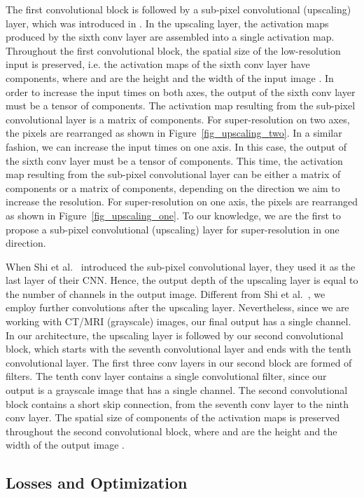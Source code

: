\documentclass{ieeeaccess}
\begin{document}
The first convolutional block is followed by a sub-pixel convolutional (upscaling) layer, which was introduced in \cite{Shi-CVPR-2016}. In the upscaling layer, the activation maps produced by the sixth conv layer are assembled into a single activation map. Throughout the first convolutional block, the spatial size of the low-resolution input is preserved, i.e. the activation maps of the sixth conv layer have  components, where  and  are the height and the width of the input image . In order to increase the input  times on both axes, the output of the sixth conv layer must be a tensor of  components. The activation map resulting from the sub-pixel convolutional layer is a matrix of  components. For super-resolution on two axes, the pixels are rearranged as shown in Figure~\ref{fig_upscaling_two}. In a similar fashion, we can increase the input  times on one axis. In this case, the output of the sixth conv layer must be a tensor of  components. This time, the activation map resulting from the sub-pixel convolutional layer can be either a matrix of  components or a matrix of  components, depending on the direction we aim to increase the resolution. For super-resolution on one axis, the pixels are rearranged as shown in Figure~\ref{fig_upscaling_one}. To our knowledge, we are the first to propose a sub-pixel convolutional (upscaling) layer for super-resolution in one direction.

When Shi et al.~\cite{Shi-CVPR-2016} introduced the sub-pixel convolutional layer, they used it as the last layer of their CNN. Hence, the output depth of the upscaling layer is equal to the number of channels in the output image. Different from Shi et al.~\cite{Shi-CVPR-2016}, we employ further convolutions after the upscaling layer. Nevertheless, since we are working with CT/MRI (grayscale) images, our final output has a single channel. In our architecture, the upscaling layer is followed by our second convolutional block, which starts with the seventh convolutional layer and ends with the tenth convolutional layer. The first three conv layers in our second block are formed of  filters. The tenth conv layer contains a single convolutional filter, since our output is a grayscale image that has a single channel. The second convolutional block contains a short skip connection, from the seventh conv layer to the ninth conv layer. The spatial size of  components of the activation maps is preserved throughout the second convolutional block, where  and  are the height and the width of the output image .

\subsection{Losses and Optimization}
\end{document}

